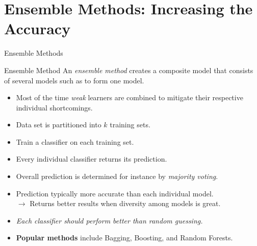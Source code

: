 \section{Ensemble Methods: Increasing the Accuracy}

\begin{frame}{Ensemble Methods}
	\begin{block}{Ensemble Method}
		An \textit{ensemble method} creates a composite model that consists of several models such as to form one model.
	\end{block}
	\begin{itemize}
		\item Most of the time \textit{weak} learners are combined to mitigate their respective individual shortcomings.
		\item Data set is partitioned into $k$ training sets.
		\item Train a classifier on each training set.
		\item Every individual classifier returns its prediction.
		\item Overall prediction is determined for instance by \textit{majority voting}.
		\item Prediction typically more accurate than each individual model.\\
		      $\rightarrow$ Returns better results when diversity among models is great.
		\item \textit{Each classifier should perform better than random guessing.}
		\item \textbf{Popular methods} include Bagging, Boosting, and Random Forests.
	\end{itemize}
\end{frame}

